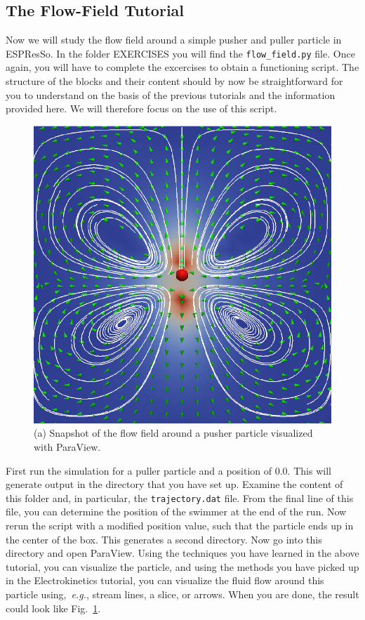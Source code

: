 \documentclass[aip,jcp,reprint,a4paper,onecolumn,amsmath]{revtex4-1}
\newcommand\code{\lstinline}
\newcommand{\es}{\mbox{\textsf{ESPResSo}}\xspace}
\begin{document}
\subsection{\label{sub:fftut}The Flow-Field Tutorial}

Now we will study the flow field around a simple pusher and puller particle in
\es{}. In the folder EXERCISES you will find the \code{flow_field.py} file.
Once again, you will have to complete the excercises to obtain a functioning
script. The structure of the blocks and their content should by now be
straightforward for you to understand on the basis of the previous tutorials
and the information provided here. We will therefore focus on the use of this
script.

\begin{figure}[!htb]
\begin{center}
\includegraphics[scale=0.75]{FIGURES/flow_field}
\end{center}
\caption{\label{fig:flow_field}(a) Snapshot of the flow field around a pusher particle visualized with ParaView.}
\end{figure}

First run the simulation for a puller particle and a position of 0.0. This will
generate output in the directory that you have set up. Examine the content of
this folder and, in particular, the \code{trajectory.dat} file. From the final
line of this file, you can determine the position of the swimmer at the end of
the run. Now rerun the script with a modified position value, such that the
particle ends up in the center of the box. This generates a second directory.
Now go into this directory and open ParaView. Using the techniques you have
learned in the above tutorial, you can visualize the particle, and using the
methods you have picked up in the Electrokinetics tutorial, you can visualize
the fluid flow around this particle using,~\textit{e.g.}, stream lines, a
slice, or arrows. When you are done, the result could look like
Fig.~\ref{fig:flow_field}.
\end{document}

